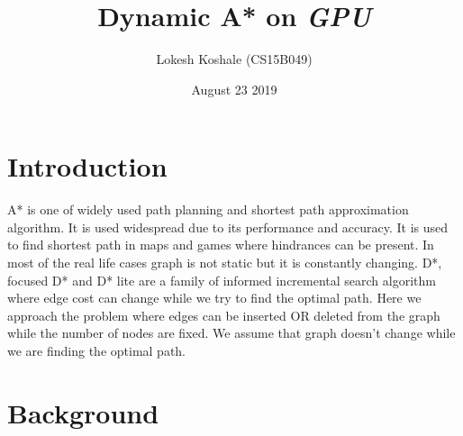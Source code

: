 \documentclass[a4paper]{article}
\title{Dynamic A* on \emph{GPU}}
\author{\normalsize Lokesh Koshale (CS15B049) \\\normalsize}
\date{\color{black}August 23 2019}
\begin{document}
 \maketitle





\section{Introduction}
A*\cite{A*}\cite{Wiki A*} is one of widely used path planning and shortest path approximation algorithm. It is used widespread due to its performance and accuracy. It is used to find shortest path in maps and games where hindrances can be present. In most of the real life cases graph is not static but it is constantly changing. D*\cite{original D*}, focused D*\cite{focused D*} and D* lite\cite{D* Lite} are a family of informed incremental search algorithm where edge cost can change while we try to find the optimal path. Here we approach the problem where edges can be inserted OR deleted from the graph while the number of nodes are fixed. We assume that graph doesn't change while we are finding the optimal path.\\


\section{Background}
\end{document}

